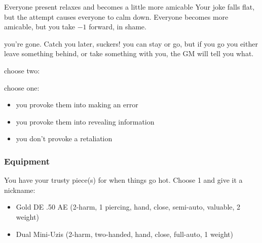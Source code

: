 {Everyone present relaxes and becomes a little more amicable}
{Your joke falls flat, but the attempt causes everyone to calm down. Everyone becomes more amicable, but you take $-1$ forward, in shame.}

{you're gone. Catch you later, suckers!}
{you can stay or go, but if you go you either leave something behind, or take something with you, the GM will tell you what.}

{choose two:}
{choose one:
\begin{itemize}
\item you provoke them into making an error
\item you provoke them into revealing information
\item you don't provoke a retaliation
\end{itemize}}



\subsubsection{Equipment}
You have your trusty piece(s) for when things go hot. Choose 1 and give it a nickname:
\begin{itemize}
\item Gold DE .50 AE (2-harm, 1 piercing, hand, close, semi-auto, valuable, 2 weight)
\item Dual Mini-Uzis (2-harm, two-handed, hand, close, full-auto, 1 weight) 
\end{itemize}

